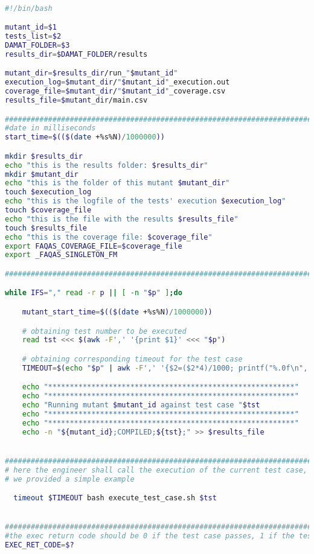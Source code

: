 \begin{lstlisting}[label={lst:run_tests},language=bash]

#!/bin/bash

mutant_id=$1
tests_list=$2
DAMAT_FOLDER=$3
results_dir=$DAMAT_FOLDER/results

mutant_dir=$results_dir/run_"$mutant_id"
execution_log=$mutant_dir/"$mutant_id"_execution.out
coverage_file=$mutant_dir/"$mutant_id"_coverage.csv
results_file=$mutant_dir/main.csv

###############################################################################
#date in milliseconds
start_time=$(($(date +%s%N)/1000000))

mkdir $results_dir
echo "this is the results folder: $results_dir"
mkdir $mutant_dir
echo "this is the folder of this mutant $mutant_dir"
touch $execution_log
echo "this is the logfile of the tests' execution $execution_log"
touch $coverage_file
echo "this is the file with the results $results_file"
touch $results_file
echo "this is the coverage file: $coverage_file"
export FAQAS_COVERAGE_FILE=$coverage_file
export _FAQAS_SINGLETON_FM

###############################################################################

while IFS="," read -r p || [ -n "$p" ];do

    mutant_start_time=$(($(date +%s%N)/1000000))

    # obtaining test number to be executed
    read tst <<< $(awk -F',' '{print $1}' <<< "$p")

    # obtaining corresponding timeout for the test case
    TIMEOUT=$(echo "$p" | awk -F',' '{$2=($2*4)/1000; printf("%.0f\n", $2);}')

    echo "*********************************************************"
    echo "*********************************************************"
    echo "Running mutant $mutant_id against test case "$tst
    echo "*********************************************************"
    echo "*********************************************************"
    echo -n "${mutant_id};COMPILED;${tst};" >> $results_file


###############################################################################
# here the engineer shall call the execution of the current test case,
# we provided a simple example

  timeout $TIMEOUT bash execute_test_case.sh $tst


###############################################################################
#the exec return code should be 0 if the test case passes, 1 if the test case fails, and 124 in case of a timeout
EXEC_RET_CODE=$?



\end{lstlisting}
